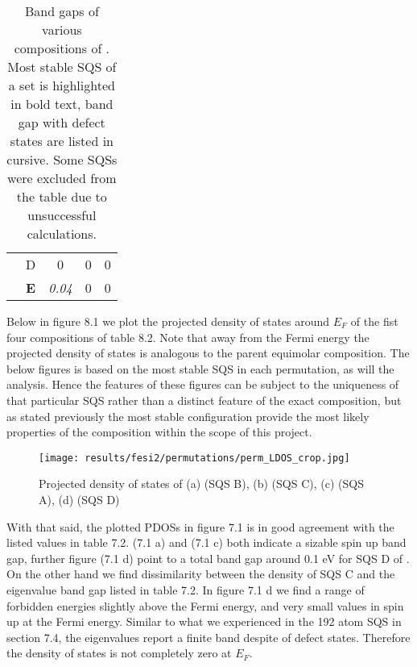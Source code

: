 \begin{table}[H]
\begin{tabular}{@{}ccccc@{}}
\multicolumn{1}{c|}{}                                       & D          & 0                                                                           & 0                                                                           & 0                                                                                 \\
\multicolumn{1}{c|}{}                                       & \textbf{E} & \textit{0.04}                                                               & 0                                                                           & 0                                                                                 \\ \bottomrule 
\end{tabular}
\caption{Band gaps of various compositions of . Most stable SQS of a set is highlighted in bold text, band gap with defect states are listed in cursive. Some SQSs were excluded from the table due to unsuccessful calculations.}
\end{table}

Below in figure 8.1 we plot the projected density of states around $E_F$ of the fist four compositions of table 8.2. Note that away from the Fermi energy the projected density of states is analogous to the parent equimolar composition. The below figures is based on the most stable SQS in each permutation, as will the analysis. Hence the features of these figures can be subject to the uniqueness of that particular SQS rather than a distinct feature of the exact composition, but as stated previously the most stable configuration provide the most likely properties of the composition within the scope of this project. 

\begin{figure}[H]
\texttt{[image: results/fesi2/permutations/perm\_LDOS\_crop.jpg]}
\caption{Projected density of states of (a)  (SQS B), (b)  (SQS C), (c)  (SQS A), (d)  (SQS D)}
\end{figure}

With that said, the plotted PDOSs in figure 7.1 is in good agreement with the listed values in table 7.2.  (7.1 a) and  (7.1 c) both indicate a sizable spin up band gap, further figure (7.1 d) point to a total band gap around 0.1 eV for SQS D of . On the other hand we find dissimilarity between the density of  SQS C and the eigenvalue band gap listed in table 7.2. In figure 7.1 d we find a range of forbidden energies slightly above the Fermi energy, and very small values in spin up at the Fermi energy. Similar to what we experienced in the 192 atom SQS in section 7.4, the eigenvalues report a finite band despite of defect states. Therefore the density of states is not completely zero at $E_F$. 

